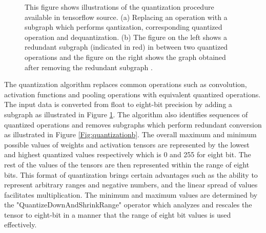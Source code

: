 \begin{figure}
\begin{subfigure}{.6\textwidth}
			\caption{}
			\label{Fig:quantizationa}
		\end{subfigure}
		\caption{ This figure shows illustrations of the quantization procedure available in tensorflow source. (a) Replacing an operation with a subgraph which performs qantization, corresponding quantized operation and dequantization. (b) The figure on the left shows a redundant subgraph (indicated in red) in between two quantized operations and the figure on the right shows the graph obtained after removing the redundant subgraph \cite{quant_blog}.}
		\label{Fig:quantization}
	\end{figure}

The quantization algorithm replaces common operations such as convolution, activation functions and pooling operations with equivalent quantized operations. The input data is converted from float to eight-bit precision by adding a subgraph as illustrated in Figure \ref{Fig:quantizationa}. The algorithm also identifies sequences of quantized operations and removes subgraphs which perform redundant conversion as illustrated in Figure \ref{Fig:quantizationb}. The overall maximum and minimum possible values of weights and activation tensors are represented by the lowest and highest quantized values respectively which is 0 and 255 for eight bit. The rest of the values of the tensors are then represented within the range of eight bits. This format of quantization brings certain advantages such as the ability to represent arbitrary ranges and negative numbers, and the linear spread of values facilitates multiplication. The minimum and maximum values are determined by the "QuantizeDownAndShrinkRange" operator which analyzes and rescales the tensor to eight-bit in a manner that the range of eight bit values is used effectively.
